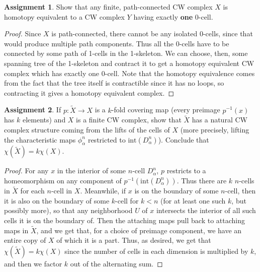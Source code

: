 \documentclass[12pt]{article}
\theoremstyle{definition}
\newtheorem{ex}{Assignment}
\begin{document}
\begin{ex}
	Show that any finite, path-connected CW complex $X$ is homotopy equivalent to a CW complex $Y$ having exactly \textbf{one} 0-cell.
\end{ex}
\begin{proof}
  Since $X$ is path-connected, there cannot be any isolated 0-cells, since that would produce multiple path components.
  Thus all the 0-cells have to be connected by some path of 1-cells in the 1-skeleton.
  We can choose, then, some spanning tree of the 1-skeleton and contract it to get a homotopy equivalent CW complex which has exactly one 0-cell.
  Note that the homotopy equivalence comes from the fact that the tree itself is contractible since it has no loops, so contracting it gives a homotopy equivalent complex.
\end{proof}

\begin{ex}
	If $p : \widetilde{X} \to X$ is a $k$-fold covering map (every preimage $p^{-1}(x)$ has $k$ elements) and $X$ is a finite CW complex, show that $\widetilde{X}$ has a natural CW complex structure coming from the lifts of the cells of $X$ (more precisely, lifting the characteristic maps $\phi^n_\alpha$ restricted to $\mathrm{int}(D^n_\alpha)$).
	Conclude that $\chi(\widetilde{X}) = k\chi(X)$.
\end{ex}
\begin{proof}
  For any $x$ in the interior of some $n$-cell $D^n_\alpha$, $p$ restricts to a homeomorphism on any component of $p^{-1}(\mathrm{int}(D^n_\alpha))$.
  Thus there are $k$ $n$-cells in $\widetilde{X}$ for each $n$-cell in $X$.
  Meanwhile, if $x$ is on the boundary of some $n$-cell, then it is also on the boundary of some $k$-cell for $k < n$ (for at least one such $k$, but possibly more), so that any neighborhood $U$ of $x$ intersects the interior of all such cells it is on the boundary of.
  Then the attaching maps pull back to attaching maps in $\widetilde{X}$, and we get that, for a choice of preimage component, we have an entire copy of $X$ of which it is a part.
  Thus, as desired, we get that $\chi(\widetilde{X}) = k\chi(X)$ since the number of cells in each dimension is multiplied by $k$, and then we factor $k$ out of the alternating sum.
\end{proof}
\end{document}
